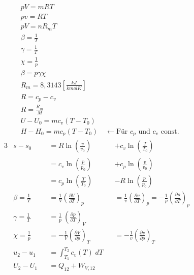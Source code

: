 \documentclass[twocolumn]{article}
\begin{document}
\begin{align*}
	&pV = mRT \\ 
	&pv = RT \\
	&pV = nR_mT \\
	&\beta = \frac{1}{T} \\
	&\gamma = \frac{1}{T} \\
	&\chi = \frac{1}{p} \\
	&\beta = p \gamma \chi\\
	&R_m = 8,3143\left[\frac{kJ}{kmolK}\right] \\
	&R = c_p - c_v\\
	&R = \frac{R_m}{M}
	\\
	&U - U_0 = mc_v(T-T_0)
	\\
	&H - H_0 = mc_p(T-T_0) \quad \leftarrow \text{Für $c_p$ und $c_v$ const.}
\end{align*}
\begin{alignat*}{3}
	&s - s_0 
	&&= R \ln \left(\frac{ v}{ v_0}\right)_{} 
	&&+ c_v \ln \left(\frac{ T}{ T_0}\right)_{}
	\\
	& 
	&&= c_v \ln \left( \frac{p}{p_0} \right) 
	&&+ c_p \ln \left( \frac{v}{v_0} \right)
	\\
	& 
	&&= c_p \ln \left( \frac{T}{T_0} \right) 
	&&-R \ln \left( \frac{p}{p_0} \right)
	\\
	&\beta 
	= \frac{1}{T} 
	&&=\frac{1}{V}\left(\frac{\partial V}{\partial T}\right)_{p} 
	&&=  \frac{1}{v}\left(\frac{\partial v}{\partial T}\right)_{p} 
	=  - \frac{1}{\rho}\left(\frac{\partial \rho}{\partial T}\right)_{p} 
	\\
	&\gamma 
	= \frac{1}{T}  
	&&= \frac{1}{p} \: \left(\frac{\partial p}{\partial T}\right)_{V}
	\\
	&\chi 
	= \frac{1}{p} 
	&&= - \frac{1}{V}\left(\frac{\partial V}{\partial p}\right)_{T}  
	&&= - \frac{1}{v}\left(\frac{\partial v}{\partial p}\right)_{T}
	\\
		& u_2 - u_1 &&= \int_{T_1}^{T_2} c_v(T)\; dT
	\\
	& U_2 - U_1 &&= Q_{12} + W_{V,12} \\
\end{alignat*}
                                                                          
\end{document}
